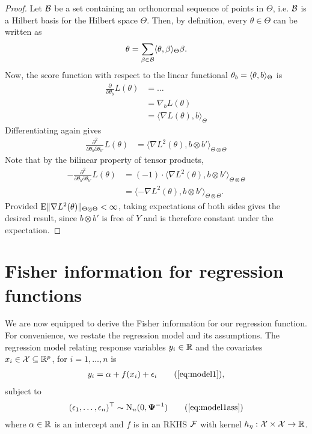 \documentclass[a4paper,showframe,11pt,draft]{report}
\begin{document}
\begin{proof}
  Let ${\mathcal B}$ be a set containing an orthonormal sequence of points in $\Theta$, i.e. ${\mathcal B}$ is a Hilbert basis for the Hilbert space $\Theta$. 
  Then, by definition, every $\theta \in \Theta$ can be written as
  \[
    \theta = \sum_{\beta \in {\mathcal B}} \langle\theta,\beta\rangle_\Theta \beta.
  \]
  Now, the score function with respect to the linear functional $\theta_b = \langle\theta,b\rangle_\Theta$ is
  \begin{align*}
    \frac{\partial}{\partial\theta_b} L(\theta) 
    &= \dots \\
    &= \nabla_b L(\theta) \\
    &= \langle \nabla L(\theta), b \rangle_{\Theta}
  \end{align*}
  Differentiating again gives
  \begin{align*}
    \frac{\partial^2}{\partial\theta_b\partial\theta_{b'}} L(\theta) 
    &= \langle \nabla L^2(\theta), b \otimes b' \rangle_{\Theta \otimes \Theta}
  \end{align*}  
  Note that by the bilinear property of tensor products,
    \begin{align*}
    -\frac{\partial^2}{\partial\theta_b\partial\theta_{b'}} L(\theta)
    &= (-1) \cdot \langle \nabla L^2(\theta), b \otimes b' \rangle_{\Theta \otimes \Theta} \\
    &= \langle -\nabla L^2(\theta), b \otimes b' \rangle_{\Theta \otimes \Theta}.
  \end{align*}  
  Provided $\operatorname{E} \lVert\nabla L^2(\theta)\rVert_{\Theta \otimes \Theta} < \infty$, taking expectations of both sides gives the desired result, since $b\otimes b'$ is free of $Y$ and is therefore constant under the expectation. 
\end{proof}

\section{Fisher information for regression functions}

We are now equipped to derive the Fisher information for our regression function.
For convenience, we restate the regression model and its assumptions.
The regression model relating response variables $y_i \in \mathbb{R}$ and the covariates $x_i \in {\mathcal X} \subseteq \mathbb{R}^p$, for $i=1,\dots,n$ is
\begin{align}
  y_i = \alpha + f(x_i) + \epsilon_i \tag{\ref{eq:model1}},
\end{align}
subject to
\begin{align}
  (\epsilon_1, \dots, \epsilon_n)^\top \sim \N_n(0, \bPsi^{-1}) \tag{\ref{eq:model1ass}}
\end{align}
where $\alpha \in \mathbb{R}$ is an intercept and $f$ is in an RKHS ${\mathcal F}$ with kernel $h_\eta:{\mathcal X} \times {\mathcal X} \to \mathbb{R}$.
\end{document}
